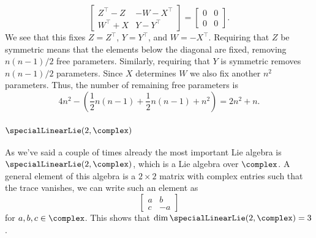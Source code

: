 \documentclass[fleqn]{NotesClass}
\newcommand{\trans}{{\top}}
\begin{document}
\begin{itemize}
        \begin{equation}
            \begin{bmatrix}
                Z^{\trans} - Z & -W - X^{\trans}\\
                W^{\trans} + X & Y - Y^{\trans}
            \end{bmatrix}
            =
            \begin{bmatrix}
                0 & 0\\
                0 & 0
            \end{bmatrix}
            .
        \end{equation}
        We see that this fixes \(Z = Z^{\trans}\), \(Y = Y^{\trans}\), and \(W = -X^{\trans}\).
        Requiring that \(Z\) be symmetric means that the elements below the diagonal are fixed, removing \(n(n-1)/2\) free parameters.
        Similarly, requiring that \(Y\) is symmetric removes \(n(n-1)/2\) parameters.
        Since \(X\) determines \(W\) we also fix another \(n^2\) parameters.
        Thus, the number of remaining free parameters is
        \begin{equation}
            4n^2 - \left( \frac{1}{2}n(n - 1) + \frac{1}{2}n(n - 1) + n^2 \right) = 2n^2 + n.
        \end{equation}
    \end{itemize}
    
    \subsubsection{\texorpdfstring{\(\specialLinearLie(2, \complex)\)}{sl(2, C)}}
    As we've said a couple of times already the most important Lie algebra is \(\specialLinearLie(2, \complex)\), which is a Lie algebra over \(\complex\).
    A general element of this algebra is a \(2 \times 2\) matrix with complex entries such that the trace vanishes, we can write such an element as
    \begin{equation}
        \begin{bmatrix}
            a & b\\
            c & -a
        \end{bmatrix}
    \end{equation}
    for \(a, b, c \in \complex\).
    This shows that \(\dim \specialLinearLie(2, \complex) = 3\).
    
\end{document}
